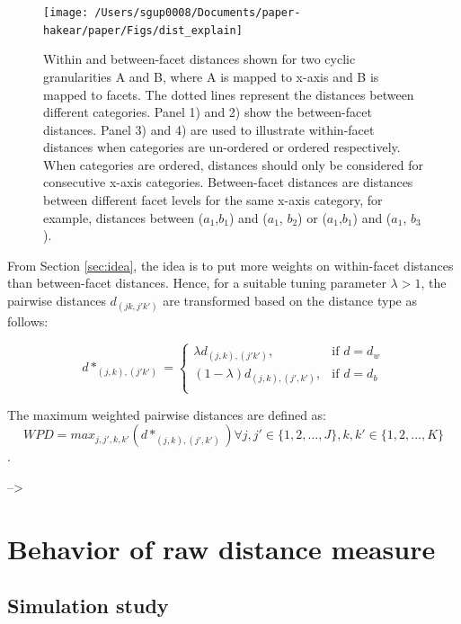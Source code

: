 \documentclass[
]{article}
\begin{document}
\begin{figure}

{\centering \texttt{[image: /Users/sgup0008/Documents/paper-hakear/paper/Figs/dist\_explain]} 

}

\caption{Within and between-facet distances shown for two cyclic granularities A and B, where A is mapped to x-axis and B is mapped to facets. The dotted lines represent the distances between different categories. Panel 1) and 2) show the between-facet distances. Panel 3) and 4) are used to illustrate within-facet distances when categories are un-ordered or ordered respectively. When categories are ordered, distances should only be considered for consecutive x-axis categories. Between-facet distances are distances between different facet levels for the same x-axis category, for example, distances between {($a_1$,$b_1$) and ($a_1$, $b_2$)} or {($a_1$,$b_1$) and ($a_1$, $b_3$)}.}\label{fig:distance-explain}
\end{figure}

From Section \ref{sec:idea}, the idea is to put more weights on within-facet distances than between-facet distances. Hence, for a suitable tuning parameter \(\lambda > 1\), the pairwise distances \(d_{(jk, j'k')}\) are transformed based on the distance type as follows:

\begin{equation}
d*_{(j,k), (j'k')} =
\begin{cases}
\lambda d_{(j,k), (j'k')},& \text{if } d = d_w\\
(1-\lambda)  d_{(j,k), (j', k')},              & \text{if } d = d_b\\
\end{cases}
\end{equation}

The maximum weighted pairwise distances are defined as:
\[WPD = max_{j, j', k, k'}(d*_{(j,k), (j', k')})
\forall j, j' \in \{1, 2, \dots, J\}, k, k' \in \{1, 2, \dots, K\}\].

--\textgreater{}

\hypertarget{behavior-of-raw-distance-measure}{%
\section{Behavior of raw distance measure}\label{behavior-of-raw-distance-measure}}

\hypertarget{simulation-study}{%
\subsection{Simulation study}\label{simulation-study}}
\end{document}
